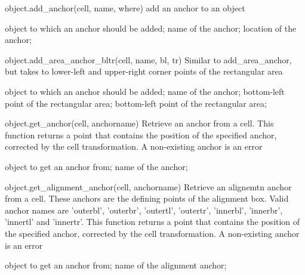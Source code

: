 \begin{APIfunc}{object.add\_anchor(cell, name, where)}
    add an anchor to an object
    \begin{APIparameters}
            object to which an anchor should be added;
            name of the anchor;
            location of the anchor;
    \end{APIparameters}
\end{APIfunc}
\begin{APIfunc}{object.add\_area\_anchor\_bltr(cell, name, bl, tr)}
    Similar to add\_area\_anchor, but takes to lower-left and upper-right corner points of the rectangular area
    \begin{APIparameters}
            object to which an anchor should be added;
            name of the anchor;
            bottom-left point of the rectangular area;
            bottom-left point of the rectangular area;
    \end{APIparameters}
\end{APIfunc}
\begin{APIfunc}{object.get\_anchor(cell, anchorname)}
    Retrieve an anchor from a cell. This function returns a point that contains the position of the specified anchor, corrected by the cell transformation. A non-existing anchor is an error
    \begin{APIparameters}
            object to get an anchor from;
            name of the anchor;
    \end{APIparameters}
\end{APIfunc}
\begin{APIfunc}{object.get\_alignment\_anchor(cell, anchorname)}
    Retrieve an alignemtn anchor from a cell. These anchors are the defining points of the alignment box. Valid anchor names are 'outerbl', 'outerbr', 'outertl', 'outertr', 'innerbl', 'innerbr', 'innertl' and 'innertr'. This function returns a point that contains the position of the specified anchor, corrected by the cell transformation. A non-existing anchor is an error
    \begin{APIparameters}
            object to get an anchor from;
            name of the alignment anchor;
    \end{APIparameters}
\end{APIfunc}

